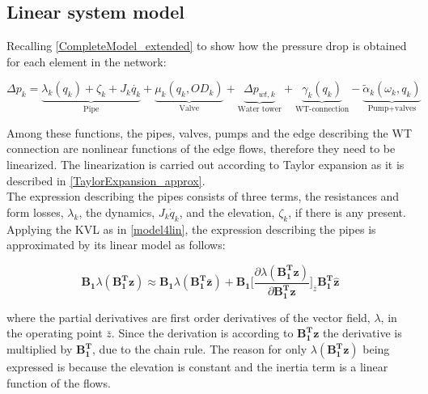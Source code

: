 %
%
%
%

\subsection{Linear system model}
 \label{SystemLin}
 
Recalling \eqref{CompleteModel_extended} to show how the pressure drop is obtained for each element in the network:

\begin{equation}
\label{CompleteModel_extended_2}
\Delta p_k \!= \! \underbrace{\lambda_k (q_k) \!+ \! \zeta_k \!+ \! J_k \dot{q_k}}_\text{Pipe} \!+ \!\underbrace{\mu_k (q_k,OD_k)}_\text{Valve}\! + \!\underbrace{\Delta p_{wt,k}}_\text{Water tower} \!+\! \underbrace{\gamma_k (q_k)}_\text{WT-connection}\! -\! \underbrace{\tilde{\alpha}_k(\omega_k,q_k)}_\text{Pump+valves}
\end{equation}

Among these functions, the pipes, valves, pumps and the edge describing the WT connection are nonlinear functions of the edge flows, therefore they need to be linearized. The linearization is carried out according to Taylor expansion as it is described in \eqref{TaylorExpansion_approx}.
\\
The expression describing the pipes consists of three terms, the resistances and form losses, $\lambda_k$, the dynamics, $J_k\dot{q}_k$, and the elevation, $\zeta_k$, if there is any present. 
\\
Applying the KVL as in \eqref{model4lin}, the expression describing the pipes is approximated by its linear model as follows:

\begin{equation}
  \bm{B_1} \lambda(\bm{{B_1^{T}}}\bm{z}) \approx  \bm{B_1} \lambda(\bm{B_1^T \bar{ z}}) + \bm{B_1} \bigg[ \frac{\partial{\lambda(\bm{{B_1^{T}}}\bm{z})}}{{\partial{\bm{{B_1^{T}}}\bm{z}}}}   \bigg]_{\bar{z}} \bm{{B_1^{T}}}\bm{\hat{z}}
\label{lambda_lin}
\end{equation}

where the partial derivatives are first order derivatives of the vector field, $\lambda$, in the operating point $\bar{z}$. Since the derivation is according to $\bm{{B_1^{T}}}\bm{z}$ the derivative is multiplied by $\bm{{B_1^{T}}}$, due to the chain rule. The reason for only $\lambda(\bm{{B_1^{T}}}\bm{z})$ being expressed is because the elevation is constant and the inertia term is a linear function of the flows. 

